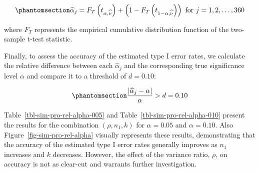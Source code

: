 \documentclass[
  12pt]{article}
\begin{document}
\begin{equation}\phantomsection\label{eq-type-I-error-rates}{\widehat{\alpha}_j = F_{T}\left(t_{\alpha,\widehat{\nu}}\right) + \left(1 - F_{T}\left(t_{1-\alpha,\widehat{\nu}}\right)\right) \text{ for } j = 1, 2, \ldots, 360}\end{equation}

where \(F_T\) represents the empirical cumulative distribution function
of the two-sample t-test statistic.

Finally, to assess the accuracy of the estimated type I error rates, we
calculate the relative difference between each \(\widehat{\alpha}_j\)
and the corresponding true significance level \(\alpha\) and compare it
to a threshold of \(d=0.10\):

\begin{equation}\phantomsection\label{eq-pro-rel-alpha}{\frac{|\widehat{\alpha}_j - \alpha|}{\alpha} > d = 0.10}\end{equation}

Table~\ref{tbl-sim-pro-rel-alpha-005} and
Table~\ref{tbl-sim-pro-rel-alpha-010} present the results for the
combination \((\rho, n_1, k)\) for \(\alpha = 0.05\) and
\(\alpha = 0.10\). Also Figure~\ref{fig-sim-pro-rel-alpha} visually
represents these results, demonstrating that the accuracy of the
estimated type I error rates generally improves as \(n_1\) increases and
\(k\) decreases. However, the effect of the variance ratio, \(\rho\), on
accuracy is not as clear-cut and warrants further investigation.

\begingroup\fontsize{7}{9}\selectfont
\end{document}
